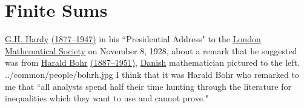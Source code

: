 ﻿%

\chapter{Finite Sums}
\label{app:pmean}
\label{chp:pmean}

\qboxnps
  {
    \href{http://en.wikipedia.org/wiki/G.H._Hardy}{G.H. Hardy}
    \href{http://www-history.mcs.st-andrews.ac.uk/Timelines/TimelineG.html}{(1877--1947)}
    in his ``Presidential Address" to the
    \href{http://en.wikipedia.org/wiki/London_mathematical_society}{London Mathematical Society}
    on November 8, 1928, about a remark that he suggested was from
    \href{http://en.wikipedia.org/wiki/Harald_Bohr}{Harald Bohr}
    \href{http://www-history.mcs.st-andrews.ac.uk/Timelines/TimelineG.html}{(1887--1951)},
    \href{http://www-history.mcs.st-andrews.ac.uk/Countries/Denmark.html}{Danish}
    mathematician pictured to the left.
     
    \footnotemark
  }
  {../common/people/bohrh.jpg}
  {I think that it was Harald Bohr who remarked to me that
   ``all analysts spend half their time hunting through the literature
   for inequalities which they want to use and cannot prove." }

